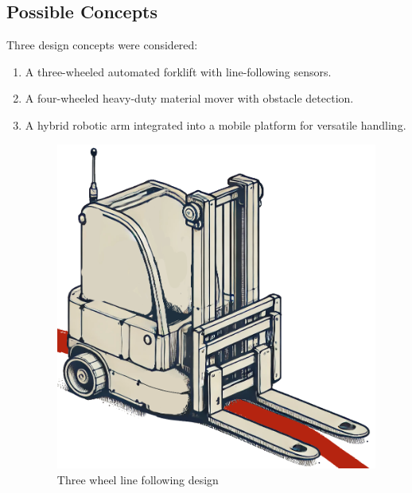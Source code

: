 \documentclass[12pt]{article}
\begin{document}
\subsection{Possible Concepts}
Three design concepts were considered:
\begin{enumerate}
    \item A three-wheeled automated forklift with line-following sensors.
    \item A four-wheeled heavy-duty material mover with obstacle detection.
    \item A hybrid robotic arm integrated into a mobile platform for versatile handling.
 

 \begin{figure}[h!]
    \centering
    \begin{minipage}{0.48\textwidth}
        \centering
        \includegraphics[width=\textwidth]{Simple_sketch_of_an_automated_forklift_robot_with_two_wheels_at_the_back_and_one_wheel_in_the_front.png}
        \caption{Three wheel line following design}
        \label{fig:three_wheel_line_flowing}
    \end{minipage}
    \hfill
    \begin{minipage}{0.48\textwidth}
        \centering

\end{minipage}
\end{figure}
\end{enumerate}
\end{document}
